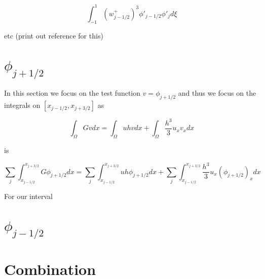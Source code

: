 \documentclass[12pt]{article}
\begin{document}
\[\int_{-1}^{1} \left(w^+_{j-1/2}\right)^3 \phi'_{j-1/2}\phi'_{j} d\xi\]

etc (print out reference for this)
 



\section{$\phi_{j+ 1/2} $}

In this section we focus on the test function $v =\phi_{j + 1/2}$ and thus we focus on the integrals on $[x_{j-1/2}, x_{j+3/2}]$ as 

\[\int_\Omega Gv dx = \int_\Omega uhv dx + \int_\Omega\frac{h^3}{3}u_{x}v_xdx\]

is 

\[\sum_{j}\int_{x_{j-1/2}}^{x_{j+3/2}} G\phi_{j+ 1/2} dx = \sum_{j}\int_{x_{j-1/2}}^{x_{j+3/2}}  uh \phi_{j + 1/2} dx + \sum_{j}\int_{x_{j-1/2}}^{x_{j+3/2}} \frac{h^3}{3}u_{x}{(\phi_{j+ 1/2})}_{x}dx\]

For our interval

\section{$\phi_{j -  1/2} $}


\section{Combination}
\end{document}
